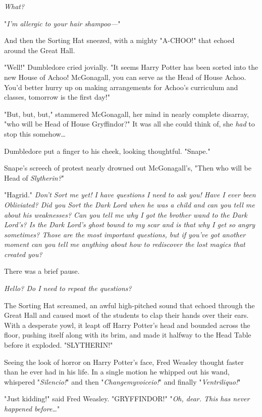 \emph{What?}

"\emph{I'm allergic to your hair shampoo---}"

And then the Sorting Hat sneezed, with a mighty "A-CHOO!" that echoed around 
the Great Hall.

"Well!" Dumbledore cried jovially. "It seems Harry Potter has been sorted into 
the new House of Achoo! McGonagall, you can serve as the Head of House Achoo. 
You'd better hurry up on making arrangements for Achoo's curriculum and 
classes, tomorrow is the first day!"

"But, but, but," stammered McGonagall, her mind in nearly complete disarray, 
"who will be Head of House Gryffindor?" It was all she could think of, she 
\emph{had} to stop this somehow{\ldots}

Dumbledore put a finger to his cheek, looking thoughtful. "Snape."

Snape's screech of protest nearly drowned out McGonagall's, "Then who will be 
Head of \emph{Slytherin?}"

"Hagrid."
\sbreak
\emph{Don't Sort me yet! I have questions I need to ask you! Have I ever been 
Obliviated? Did you Sort the Dark Lord when he was a child and can you tell me 
about his weaknesses? Can you tell me why I got the brother wand to the Dark 
Lord's? Is the Dark Lord's ghost bound to my scar and is that why I get so 
angry sometimes? Those are the most important questions, but if you've got 
another moment can you tell me anything about how to rediscover the lost magics 
that created you?}

There was a brief pause.

\emph{Hello? Do I need to repeat the questions?}

The Sorting Hat screamed, an awful high-pitched sound that echoed through the 
Great Hall and caused most of the students to clap their hands over their ears. 
With a desperate yowl, it leapt off Harry Potter's head and bounded across the 
floor, pushing itself along with its brim, and made it halfway to the Head 
Table before it exploded.
\sbreak
"SLYTHERIN!"

Seeing the look of horror on Harry Potter's face, Fred Weasley thought faster 
than he ever had in his life. In a single motion he whipped out his wand, 
whispered "\emph{Silencio!}" and then "\emph{Changemyvoiceio!}" and finally 
"\emph{Ventriliquo!}"

"Just kidding!" said Fred Weasley. "GRYFFINDOR!"
\sbreak
"\emph{Oh, dear. This has never happened before{\ldots}}"


